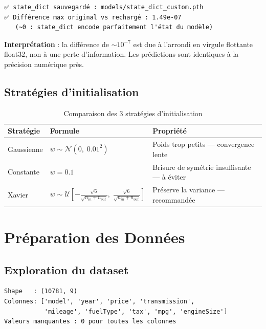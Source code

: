 \documentclass[12pt,a4paper]{report}
\begin{document}
\begin{newbox}
\begin{outputbox}
\begin{verbatim}
✅ state_dict sauvegardé : models/state_dict_custom.pth
✅ Différence max original vs rechargé : 1.49e-07
   (~0 : state_dict encode parfaitement l'état du modèle)
\end{verbatim}
\end{outputbox}

\textbf{Interprétation} : la différence de $\sim 10^{-7}$ est due à l'arrondi 
en virgule flottante float32, non à une perte d'information. Les prédictions 
sont identiques à la précision numérique près.
\end{newbox}

\subsection{Stratégies d'initialisation}

\begin{table}[H]
\centering
\caption{Comparaison des 3 stratégies d'initialisation}
\begin{tabular}{lll}
\toprule
\textbf{Stratégie} & \textbf{Formule} & \textbf{Propriété} \\
\midrule
Gaussienne & $w \sim \mathcal{N}(0,\;0.01^2)$ & Poids trop petits --- convergence lente \\
Constante  & $w = 0.1$ & Brisure de symétrie insuffisante --- à éviter \\
Xavier & $w \sim \mathcal{U}\!\!\left[-\tfrac{\sqrt{6}}{\sqrt{n_{in}+n_{out}}},\;
         \tfrac{\sqrt{6}}{\sqrt{n_{in}+n_{out}}}\right]$ &
         Préserve la variance --- recommandée \\
\bottomrule
\end{tabular}
\end{table}

\section{Préparation des Données}

\subsection{Exploration du dataset}

\begin{outputbox}
\begin{verbatim}
Shape   : (10781, 9)
Colonnes: ['model', 'year', 'price', 'transmission',
           'mileage', 'fuelType', 'tax', 'mpg', 'engineSize']
Valeurs manquantes : 0 pour toutes les colonnes
\end{verbatim}
\end{outputbox}
\end{document}

